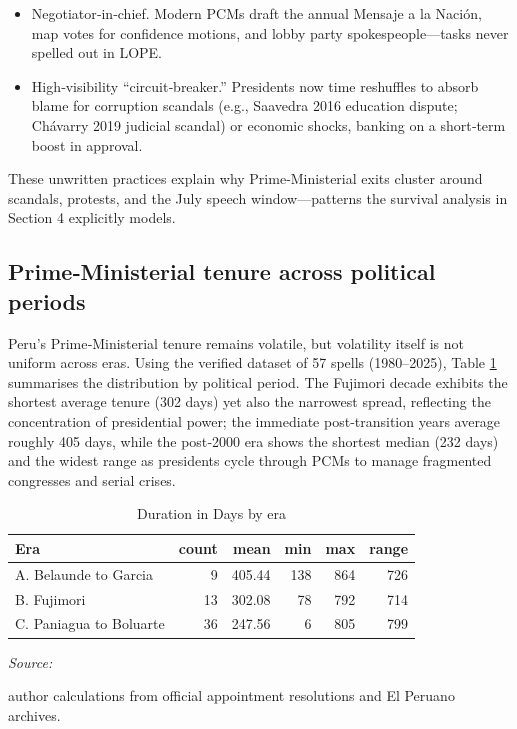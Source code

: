 \documentclass[a4paper, 12pt]{article}
\begin{document}
\begin{itemize}
\item Negotiator‑in‑chief. Modern PCMs draft the annual Mensaje a la Nación, map votes for confidence motions, and lobby party spokespeople—tasks never spelled out in LOPE.

\item High‑visibility “circuit‑breaker.” Presidents now time reshuffles to absorb blame for corruption scandals (e.g., Saavedra 2016 education dispute; Chávarry 2019 judicial scandal) or economic shocks, banking on a short‑term boost in approval.

\end{itemize}

These unwritten practices explain why Prime‑Ministerial exits cluster around scandals, protests, and the July speech window—patterns the survival analysis in Section 4 explicitly models.


\subsection{Prime‑Ministerial tenure across political periods}

Peru’s Prime‑Ministerial tenure remains volatile, but volatility itself is not uniform across eras.  Using the verified dataset of 57 spells (1980–2025), Table \ref{tab:durationPerEra} summarises the distribution by political period.  The Fujimori decade exhibits the shortest average tenure (302 days) yet also the narrowest spread, reflecting the concentration of presidential power; the immediate post‑transition years average roughly 405 days, while the post‑2000 era shows the shortest median (232 days) and the widest range as presidents cycle through PCMs to manage fragmented congresses and serial crises.



\begin{table}[!h]
\centering
\caption{Duration in Days by era\label{tab:durationPerEra}}
\centering
\begin{threeparttable}
\begin{tabular}[t]{lrrrrr}
\toprule
Era & count & mean & min & max & range\\
\midrule
A. Belaunde to Garcia & 9 & 405.44 & 138 & 864 & 726\\
B. Fujimori & 13 & 302.08 & 78 & 792 & 714\\
C. Paniagua to Boluarte & 36 & 247.56 & 6 & 805 & 799\\
\bottomrule
\end{tabular}
\begin{tablenotes}[para]
\item \textit{Source: } 
\item author calculations from official appointment resolutions and El Peruano archives.
\end{tablenotes}
\end{threeparttable}
\end{table}
\end{document}
